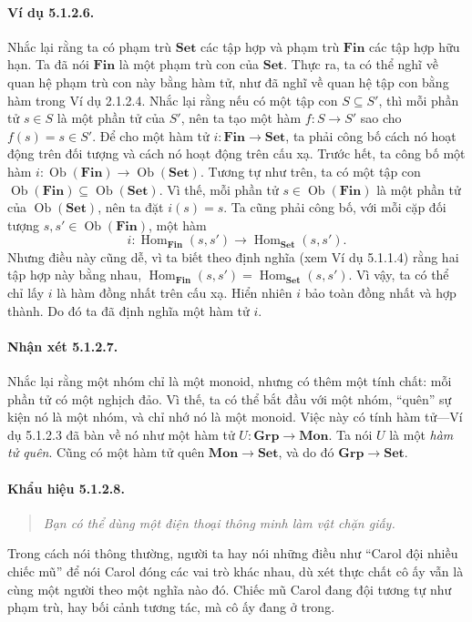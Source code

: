 \paragraph{Ví dụ 5.1.2.6.} Nhắc lại rằng ta có phạm trù $\mathbf{Set}$ các tập hợp và phạm trù $\mathbf{Fin}$ các tập hợp hữu hạn. Ta đã nói $\mathbf{Fin}$ là một phạm trù con của $\mathbf{Set}$. Thực ra, ta có thể nghĩ về quan hệ phạm trù con này bằng hàm tử, như đã nghĩ về quan hệ tập con bằng hàm trong Ví dụ 2.1.2.4. Nhắc lại rằng nếu có một tập con $S\subseteq S'$, thì mỗi phần tử $s\in S$ là một phần tử của $S'$, nên ta tạo một hàm $f:S\to S'$ sao cho $f(s)=s\in S'$.
Để cho một hàm tử $i:\mathbf{Fin}\to\mathbf{Set}$, ta phải công bố cách nó hoạt động trên đối tượng và cách nó hoạt động trên cấu xạ. Trước hết, ta công bố một hàm $i:\operatorname{Ob}(\mathbf{Fin})\to\operatorname{Ob}(\mathbf{Set})$. Tương tự như trên, ta có một tập con $\operatorname{Ob}(\mathbf{Fin})\subseteq\operatorname{Ob}(\mathbf{Set})$. Vì thế, mỗi phần tử $s\in\operatorname{Ob}(\mathbf{Fin})$ là một phần tử của $\operatorname{Ob}(\mathbf{Set})$, nên ta đặt $i(s)=s$. Ta cũng phải công bố, với mỗi cặp đối tượng $s,s'\in\operatorname{Ob}(\mathbf{Fin})$, một hàm
\[i:\operatorname{Hom}_{\mathbf{Fin}}(s,s')\longrightarrow\operatorname{Hom}_{\mathbf{Set}}(s,s').\]
Nhưng điều này cũng dễ, vì ta biết theo định nghĩa (xem Ví dụ 5.1.1.4) rằng hai tập hợp này bằng nhau, $\operatorname{Hom}_{\mathbf{Fin}}(s,s')=\operatorname{Hom}_{\mathbf{Set}}(s,s')$. Vì vậy, ta có thể chỉ lấy $i$ là hàm đồng nhất trên cấu xạ. Hiển nhiên $i$ bảo toàn đồng nhất và hợp thành. Do đó ta đã định nghĩa một hàm tử $i$.
\paragraph{Nhận xét 5.1.2.7.} Nhắc lại rằng một nhóm chỉ là một monoid, nhưng có thêm một tính chất: mỗi phần tử có một nghịch đảo. Vì thế, ta có thể bắt đầu với một nhóm, ``quên'' sự kiện nó là một nhóm, và chỉ nhớ nó là một monoid. Việc này có tính hàm tử---Ví dụ 5.1.2.3 đã bàn về nó như một hàm tử $U:\mathbf{Grp}\to\mathbf{Mon}$. Ta nói $U$ là một \emph{hàm tử quên}. Cũng có một hàm tử quên $\mathbf{Mon}\to\mathbf{Set}$, và do đó $\mathbf{Grp}\to\mathbf{Set}$.
\paragraph{Khẩu hiệu 5.1.2.8.}
\begin{quote}\emph{Bạn có thể dùng một điện thoại thông minh làm vật chặn giấy.}\end{quote}
Trong cách nói thông thường, người ta hay nói những điều như ``Carol đội nhiều chiếc mũ'' để nói Carol đóng các vai trò khác nhau, dù xét thực chất cô ấy vẫn là cùng một người theo một nghĩa nào đó. Chiếc mũ Carol đang đội tương tự như phạm trù, hay bối cảnh tương tác, mà cô ấy đang ở trong.
